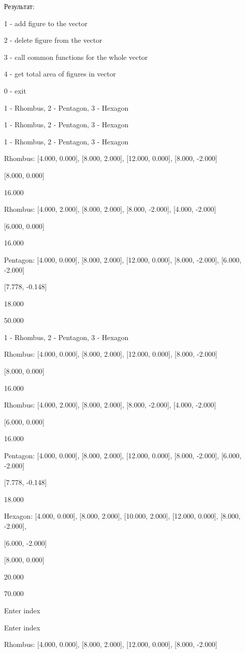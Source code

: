 \documentclass[a4paper, 12pt]{article}
\begin{document}
Результат:

1 - add figure to the vector

2 - delete figure from the vector

3 - call common functions for the whole vector

4 - get total area of figures in vector

0 - exit

1 - Rhombus, 2 - Pentagon, 3 - Hexagon

1 - Rhombus, 2 - Pentagon, 3 - Hexagon

1 - Rhombus, 2 - Pentagon, 3 - Hexagon

Rhombus: [4.000, 0.000], [8.000, 2.000], [12.000, 0.000], [8.000, -2.000]

[8.000, 0.000]

16.000

Rhombus: [4.000, 2.000], [8.000, 2.000], [8.000, -2.000], [4.000, -2.000]

[6.000, 0.000]

16.000

Pentagon: [4.000, 0.000], [8.000, 2.000], [12.000, 0.000], [8.000, -2.000], [6.000, -2.000]

[7.778, -0.148]

18.000

50.000

1 - Rhombus, 2 - Pentagon, 3 - Hexagon

Rhombus: [4.000, 0.000], [8.000, 2.000], [12.000, 0.000], [8.000, -2.000]

[8.000, 0.000]

16.000

Rhombus: [4.000, 2.000], [8.000, 2.000], [8.000, -2.000], [4.000, -2.000]

[6.000, 0.000]

16.000

Pentagon: [4.000, 0.000], [8.000, 2.000], [12.000, 0.000], [8.000, -2.000], [6.000, -2.000]

[7.778, -0.148]

18.000

Hexagon: [4.000, 0.000], [8.000, 2.000], [10.000, 2.000], [12.000, 0.000], [8.000, -2.000], 

[6.000, -2.000]

[8.000, 0.000]

20.000

70.000

Enter index

Enter index

Rhombus: [4.000, 0.000], [8.000, 2.000], [12.000, 0.000], [8.000, -2.000]
\end{document}
